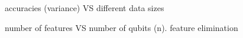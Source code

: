 \documentclass[
10pt,
aps,
pra,
linenumbers,
floatfix,
]{revtex4-2}
\theoremstyle{plain}
\theoremstyle{definition}
\begin{document}
\begin{figure}[!ht]
	\centering
	\caption{accuracies (variance) VS different data sizes}
\end{figure}
\begin{figure}[!ht]
	\centering
	\caption{number of features VS number of qubits (n). feature elimination}
\end{figure}

\end{document}
